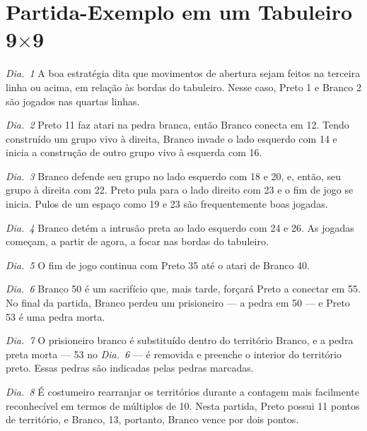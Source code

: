 \section{Partida-Exemplo em um Tabuleiro \texorpdfstring{9$\times$9}{9x9}}

\emph{Dia.\@~1} A boa estratégia dita que movimentos de abertura sejam feitos na terceira linha ou acima, em relação às bordas do tabuleiro. Nesse caso, Preto 1 e Branco 2 são jogados nas quartas linhas.

\emph{Dia.\@~2} Preto 11 faz atari na pedra branca, então Branco conecta em 12. Tendo construído um grupo vivo à direita, Branco invade o lado esquerdo com 14 e inicia a construção de outro grupo vivo à esquerda com 16.

\emph{Dia.\@~3} Branco defende seu grupo no lado esquerdo com 18 e 20, e, então, seu grupo à direita com 22. Preto pula para o lado direito com 23 e o fim de jogo se inicia. Pulos de um espaço como 19 e 23 são frequentemente boas jogadas.

\emph{Dia.\@~4} Branco detém a intrusão preta ao lado esquerdo com 24 e 26. As jogadas começam, a partir de agora, a focar nas bordas do tabuleiro.

\emph{Dia.\@~5} O fim de jogo continua com Preto 35 até o atari de Branco 40.

\emph{Dia.\@~6} Branco 50 é um sacrifício que, mais tarde, forçará Preto a conectar em 55. No final da partida, Branco perdeu um prisioneiro --- a pedra em 50 --- e Preto 53 é uma pedra morta.

\emph{Dia.\@~7} O prisioneiro branco é substituído dentro do território Branco, e a pedra preta morta --- 53 no \emph{Dia.\@~6} --- é removida e preenche o interior do território preto. Essas pedras são indicadas pelas pedras marcadas.

\emph{Dia.\@~8} É costumeiro rearranjar os territórios durante a contagem mais facilmente reconhecível em termos de múltiplos de 10. Nesta partida, Preto possui 11 pontos de território, e Branco, 13, portanto, Branco vence por dois pontos.